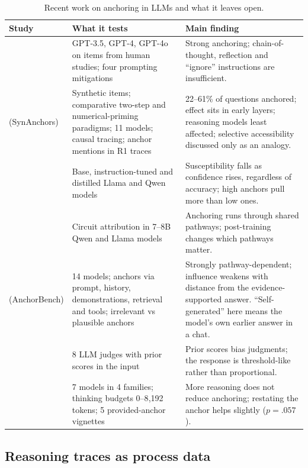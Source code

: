 \documentclass[11pt,a4paper]{article}
\begin{document}
\begin{table}[t]
\centering
\small
\caption{Recent work on anchoring in LLMs and what it leaves open.}
\label{tab:related}
\begin{tabularx}{\textwidth}{@{}p{3.3cm}LL@{}}
\toprule
\textbf{Study} & \textbf{What it tests} & \textbf{Main finding} \\
\midrule
\citet{lou2026anchoring} & GPT-3.5, GPT-4, GPT-4o on items from human studies; four prompting mitigations & Strong anchoring; chain-of-thought, reflection and ``ignore'' instructions are insufficient. \\
\addlinespace
\citet{huang2025understanding} (SynAnchors) & Synthetic items; comparative two-step and numerical-priming paradigms; 11 models; causal tracing; anchor mentions in R1 traces & 22--61\% of questions anchored; effect sits in early layers; reasoning models least affected; selective accessibility discussed only as an analogy. \\
\addlinespace
\citet{owusu2026anchoring} & Base, instruction-tuned and distilled Llama and Qwen models & Susceptibility falls as confidence rises, regardless of accuracy; high anchors pull more than low ones. \\
\addlinespace
\citet{owusu2026localizing} & Circuit attribution in 7--8B Qwen and Llama models & Anchoring runs through shared pathways; post-training changes which pathways matter. \\
\addlinespace
\citet{borjigin2026anchorbench} (AnchorBench) & 14 models; anchors via prompt, history, demonstrations, retrieval and tools; irrelevant vs plausible anchors & Strongly pathway-dependent; influence weakens with distance from the evidence-supported answer. ``Self-generated'' here means the model's own earlier answer in a chat. \\
\addlinespace
\citet{kapetanovic2026anchoring} & 8 LLM judges with prior scores in the input & Prior scores bias judgments; the response is threshold-like rather than proportional. \\
\addlinespace
\citet{kraishan2026long} & 7 models in 4 families; thinking budgets 0--8{,}192 tokens; 5 provided-anchor vignettes & More reasoning does not reduce anchoring; restating the anchor helps slightly ($p=.057$). \\
\bottomrule
\end{tabularx}
\end{table}

\subsection{Reasoning traces as process data}
\end{document}

